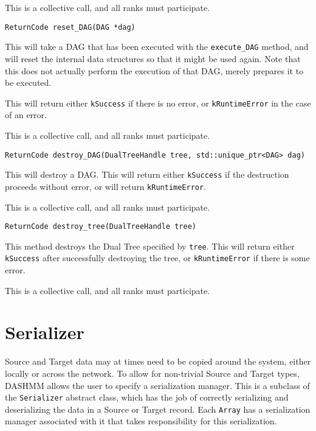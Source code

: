 This is a collective call, and all ranks must participate.

\begin{lstlisting}
ReturnCode reset_DAG(DAG *dag)
\end{lstlisting}

\noindent This will take a DAG that has been executed with the
\texttt{execute\_DAG}
method, and will reset the internal data structures so that it might be used
again. Note that this does not actually perform the execution of that DAG,
merely prepares it to be executed.

This will return either \texttt{kSuccess} if there is no error, or
\texttt{kRuntimeError} in the case of an error.

This is a collective call, and all ranks must participate.

\begin{lstlisting}
ReturnCode destroy_DAG(DualTreeHandle tree, std::unique_ptr<DAG> dag)
\end{lstlisting}

\noindent This will destroy a DAG. This will return either \texttt{kSuccess}
if the destruction proceeds without error, or will return
\texttt{kRuntimeError}.

This is a collective call, and all ranks must participate.

\begin{lstlisting}
ReturnCode destroy_tree(DualTreeHandle tree)
\end{lstlisting}

\noindent This method destroys the Dual Tree specified by \texttt{tree}. This
will return either \texttt{kSuccess} after successfully destroying the tree, or
\texttt{kRuntimeError} if there is some error.

This is a collective call, and all ranks must participate.


\section{Serializer}
\label{sec:serializer}

Source and Target data may at times need to be copied around the system, either
locally or across the network. To allow for non-trivial Source and Target
types, DASHMM allows the user to specify a serialization manager. This is
a subclass of the \texttt{Serializer} abstract class, which has the job of
correctly serializing and deserializing the data in a Source or Target
record. Each \texttt{Array} has a serialization manager associated with it that
takes responsibility for this serialization.

